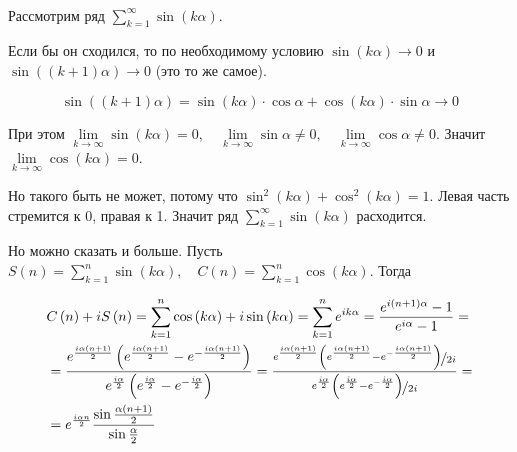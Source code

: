 \documentclass[../main.tex]{subfiles}
\begin{document}
\begin{example}
    
    ~

    Рассмотрим ряд \( \sum\limits_{ k=1}^{ \infty } \sin\left( k \alpha \right)\).

    Если бы он сходился, то по необходимому условию \( \sin\left( k \alpha \right) \longrightarrow 0\) и \( \sin \left( \left( k+1\right) \alpha \right) \longrightarrow 0\) (это то же самое). 

    \[ \sin\left( \left( k+1\right) \alpha \right)=\sin\left( k \alpha \right) \cdot \cos \alpha + \cos\left( k \alpha \right) \cdot \sin \alpha \longrightarrow 0\]

    При этом \( \lim\limits_{ k \rightarrow \infty } \sin\left( k \alpha \right) =0,\quad \lim\limits_{ k \rightarrow \infty } \sin \alpha \neq 0,\quad \lim\limits_{ k \rightarrow \infty } \cos \alpha \neq 0\). Значит \( \lim\limits_{ k \rightarrow \infty } \cos \left( k \alpha \right)=0\). 
    
    Но такого быть не может, потому что \( \sin^2\left( k \alpha \right)+\cos^2\left( k \alpha \right)=1\). Левая часть стремится к 0, правая к 1. Значит ряд \( \sum\limits_{ k=1}^{ \infty } \sin\left( k \alpha \right)\) расходится.

    Но можно сказать и больше. Пусть \( S\left( n\right)= \sum\limits_{ k=1}^{ n} \sin\left( k \alpha \right),\quad C\left( n\right)= \sum\limits_{ k=1}^{ n} \cos\left( k \alpha \right)\). Тогда

    \begin{equation*}
        \begin{aligned}
            & C\left( n\right)+iS\left( n\right)= \sum\limits_{ k=1}^{ n} \cos\left( k \alpha \right) + i\sin\left( k \alpha \right)= \sum\limits_{ k=1}^{ n} e^{ik \alpha }= \dfrac{ e^{i(n+1)\alpha}-1}{ e^{i\alpha}-1} =\\ 
            & = \dfrac{ e^\frac{{i\alpha}\left(n+1\right)}{ 2}\left(e^{\frac{i\alpha\left(n+1\right)}{2}}-e^{-\frac{i\alpha\left(n+1\right)}{2}}\right)}{ e^{ \frac{ i\alpha}{ 2} } \left( e^{ \frac{ i\alpha}{ 2}}-e^{ -\frac{ i\alpha}{ 2}}\right)} =\dfrac{ \nicefrac{ e^\frac{{i\alpha}\left(n+1\right)}{ 2}\left(e^{\frac{i\alpha\left(n+1\right)}{2}}-e^{-\frac{i\alpha\left(n+1\right)}{2}}\right)}{ 2i} }{ \nicefrac{ e^{\frac{i\alpha}{2} }\left(e^{\frac{i\alpha}{2}}-e^{-\frac{i\alpha}{2}}\right)}{2i} }=\\ 
            & = e^{ \frac{ i\alpha n}{ 2} } \dfrac{ \sin\frac{\alpha\left(n+1\right)}{ 2}}{ \sin \frac{ \alpha}{ 2} } 
        \end{aligned}
    \end{equation*}


\end{example}
\end{document}
